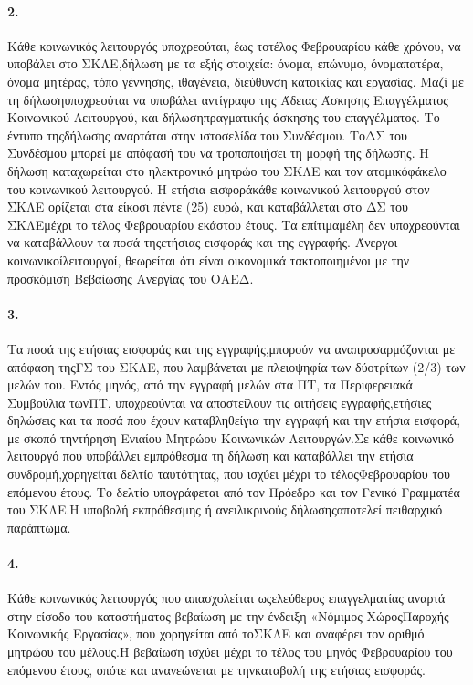 \documentclass[a4paper,oneside, 10pt]{book}
\begin{document}
\paragraph { 2. } Κάθε κοινωνικός λειτουργός υποχρεούται, έως τοτέλος Φεβρουαρίου κάθε χρόνου, να υποβάλει στο ΣΚΛΕ,δήλωση με τα εξής στοιχεία: όνομα, επώνυμο, όνομαπατέρα, όνομα μητέρας, τόπο γέννησης, ιθαγένεια, διεύθυνση κατοικίας και εργασίας. Μαζί με τη δήλωσηυποχρεούται να υποβάλει αντίγραφο της Άδειας Άσκησης Επαγγέλματος Κοινωνικού Λειτουργού, και δήλωσηπραγματικής άσκησης του επαγγέλματος. Το έντυπο τηςδήλωσης αναρτάται στην ιστοσελίδα του Συνδέσμου. ΤοΔΣ του Συνδέσμου μπορεί με απόφασή του να τροποποιήσει τη μορφή της δήλωσης. Η δήλωση καταχωρείται στο ηλεκτρονικό μητρώο του ΣΚΛΕ και τον ατομικόφάκελο του κοινωνικού λειτουργού. Η ετήσια εισφοράκάθε κοινωνικού λειτουργού στον ΣΚΛΕ ορίζεται στα είκοσι πέντε (25) ευρώ, και καταβάλλεται στο ΔΣ του ΣΚΛΕμέχρι το τέλος Φεβρουαρίου εκάστου έτους. Τα επίτιμαμέλη δεν υποχρεούνται να καταβάλλουν τα ποσά τηςετήσιας εισφοράς και της εγγραφής. Άνεργοι κοινωνικοίλειτουργοί, θεωρείται ότι είναι οικονομικά τακτοποιημένοι με την προσκόμιση Βεβαίωσης Ανεργίας του ΟΑΕΔ.
\paragraph { 3. } Τα ποσά της ετήσιας εισφοράς και της εγγραφής,μπορούν να αναπροσαρμόζονται με απόφαση τηςΓΣ του ΣΚΛΕ, που λαμβάνεται με πλειοψηφία των δύοτρίτων (2/3) των μελών του. Εντός μηνός, από την εγγραφή μελών στα ΠΤ, τα Περιφερειακά Συμβούλια τωνΠΤ, υποχρεούνται να αποστείλουν τις αιτήσεις εγγραφής,ετήσιες δηλώσεις και τα ποσά που έχουν καταβληθείγια την εγγραφή και την ετήσια εισφορά, με σκοπό τηντήρηση Ενιαίου Μητρώου Κοινωνικών Λειτουργών.Σε κάθε κοινωνικό λειτουργό που υποβάλλει εμπρόθεσμα τη δήλωση και καταβάλλει την ετήσια συνδρομή,χορηγείται δελτίο ταυτότητας, που ισχύει μέχρι το τέλοςΦεβρουαρίου του επόμενου έτους. Το δελτίο υπογράφεται από τον Πρόεδρο και τον Γενικό Γραμματέα του ΣΚΛΕ.Η υποβολή εκπρόθεσμης ή ανειλικρινούς δήλωσηςαποτελεί πειθαρχικό παράπτωμα.
\paragraph { 4. } Κάθε κοινωνικός λειτουργός που απασχολείται ωςελεύθερος επαγγελματίας αναρτά στην είσοδο του καταστήματος βεβαίωση με την ένδειξη «Νόμιμος ΧώροςΠαροχής Κοινωνικής Εργασίας», που χορηγείται από τοΣΚΛΕ και αναφέρει τον αριθμό μητρώου του μέλους.Η βεβαίωση ισχύει μέχρι το τέλος του μηνός Φεβρουαρίου του επόμενου έτους, οπότε και ανανεώνεται με τηνκαταβολή της ετήσιας εισφοράς.
\end{document}
